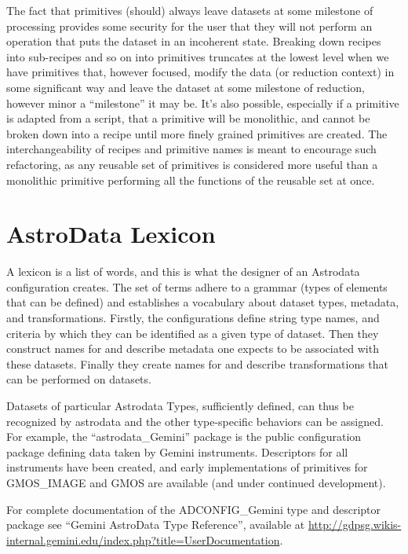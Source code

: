 \documentclass[letterpaper,10pt,english]{sphinxmanual}
\begin{document}
The fact that primitives (should) always leave datasets at some
milestone of processing provides some security for the user that they
will not perform an operation that puts the dataset in an incoherent
state. Breaking down recipes into sub-recipes and so on into
primitives truncates at the lowest level when we have primitives that,
however focused, modify the data (or reduction context) in some
significant way and leave the dataset at some milestone of reduction,
however minor a ``milestone'' it may be. It's also possible, especially
if a primitive is adapted from a script, that a primitive will be
monolithic, and cannot be broken down into a recipe until more finely
grained primitives are created. The interchangeability of recipes and
primitive names is meant to encourage such refactoring, as any
reusable set of primitives is considered more useful than a monolithic
primitive performing all the functions of the reusable set at once.


\section{AstroData Lexicon}
\label{gen.ADMANUAL_ADConcepts:astrodata-lexicon}
A lexicon is a list of words, and this is what the designer of an
Astrodata configuration creates. The set of terms adhere to a grammar
(types of elements that can be defined) and establishes a vocabulary
about dataset types, metadata, and transformations. Firstly, the
configurations define string type names, and criteria by which they
can be identified as a given type of dataset. Then they construct
names for and describe metadata one expects to be associated with
these datasets. Finally they create names for and describe
transformations that can be performed on datasets.

Datasets of particular Astrodata Types, sufficiently defined, can thus
be recognized by astrodata and the other type-specific behaviors can
be assigned. For example, the ``astrodata\_Gemini'' package is the public
configuration package defining data taken by Gemini instruments.
Descriptors for all instruments have been created, and early
implementations of primitives for GMOS\_IMAGE and GMOS are available
(and under continued development).

For complete documentation of the ADCONFIG\_Gemini type and descriptor
package see ``Gemini AstroData Type Reference'', available at
\href{http://gdpsg.wikis-internal.gemini.edu/index.php?title=UserDocumentation}{http://gdpsg.wikis-
internal.gemini.edu/index.php?title=UserDocumentation}.
\end{document}
